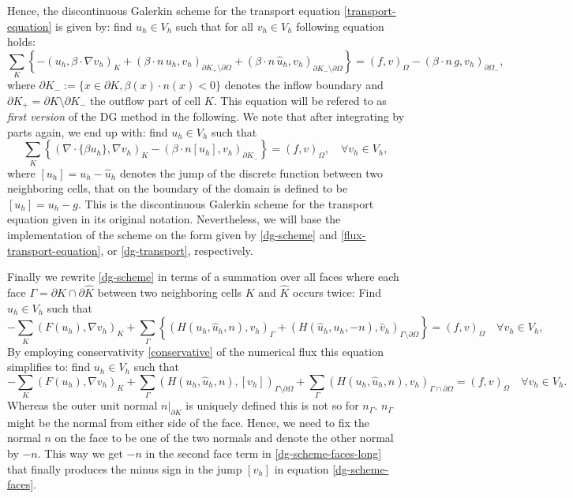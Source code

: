 \documentclass[11pt]{article}
\begin{document}
Hence, the discontinuous Galerkin scheme for the transport equation
\eqref{transport-equation} is given by: find $u_h\in V_h$ such that for all $v_h\in V_h$ following equation holds:
\begin{equation}\label{dg-transport}
  \sum_K\left\{-(u_h,\beta\cdot\nabla v_h)_K+(\beta\cdot n\, u_h, v_h)_{\partial K_+\setminus\partial\Omega}+(\beta\cdot n\, \hat u_h, v_h)_{\partial K_-\setminus\partial\Omega}\right\}=(f,v)_\Omega-(\beta\cdot n\, g, v_h)_{\partial\Omega_-},
\end{equation}
where $\partial K_-:=\{x\in\partial K, \beta(x)\cdot n(x)<0\}$ denotes
the inflow boundary and $\partial K_+=\partial K\setminus \partial
K_-$ the outflow part of cell $K$. This equation will be
refered to as \emph{first version} of the DG method in the following. We
note that after integrating by parts again, we end up with: find
$u_h\in V_h$ such that
\[
  \sum_K\left\{(\nabla\cdot\{\beta u_h\},\nabla v_h)_K-(\beta\cdot n [u_h], v_h)_{\partial K_-}\right\}=(f,v)_\Omega, \quad\forall v_h\in V_h,
\]
where $[u_h]=u_h-\hat u_h$ denotes the jump of the discrete function
between two neighboring cells, that on the boundary of the domain is defined to be $[u_h]=u_h-g$. This is the discontinuous Galerkin
scheme for the transport equation given in its original notation.
Nevertheless, we will base the implementation of the scheme on the form
given by \eqref{dg-scheme} and \eqref{flux-transport-equation}, or
\eqref{dg-transport}, respectively.

Finally we rewrite \eqref{dg-scheme} in terms of a summation over all faces 
where each face $\Gamma=\partial
K\cap\partial \hat K$ between two neighboring cells $K$ and $\hat K$
occurs twice: Find $u_h\in V_h$ such that
\begin{equation}\label{dg-scheme-faces-long}
  -\sum_K(F(u_h),\nabla v_h)_K+\sum_\Gamma\left\{(H(u_h,\hat u_h,n), v_h)_\Gamma+(H(\hat u_h, u_h,-n), \hat v_h)_{\Gamma\setminus\partial\Omega}\right\}=(f,v)_\Omega \quad\forall v_h\in V_h,
\end{equation}
By employing conservativity \eqref{conservative} of the numerical flux
this equation simplifies to: find $u_h\in V_h$ such that
\begin{equation}\label{dg-scheme-faces}
  -\sum_K(F(u_h),\nabla v_h)_K+\sum_\Gamma(H(u_h,\hat u_h,n), [v_h])_{\Gamma\setminus\partial\Omega}+\sum_\Gamma(H(u_h,\hat u_h,n), v_h)_{\Gamma\cap\partial\Omega}=(f,v)_\Omega \quad\forall v_h\in V_h.
\end{equation}
Whereas the outer unit normal
$n|_{\partial K}$ is uniquely defined this is not so for $n_\Gamma$. $n_\Gamma$ might be the normal from
either side of the face. Hence, we need to fix the normal $n$ on the face to
be one of the two normals and denote the other normal by
$-n$. This way we get $-n$ in the second face term in
\eqref{dg-scheme-faces-long} that finally produces the minus sign in
the jump $[v_h]$ in equation \eqref{dg-scheme-faces}.
\end{document}
